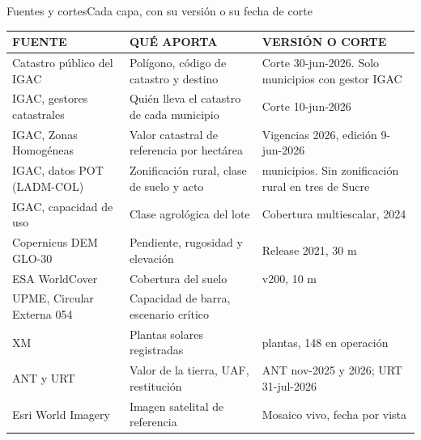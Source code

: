 \documentclass[aspectratio=169, 11pt]{beamer}
\renewcommand{\arraystretch}{1.25}
\begin{document}
\begin{frame}{Fuentes y cortes}{Cada capa, con su versión o su fecha de corte}
  {\scriptsize\renewcommand{\arraystretch}{0.82}
  \begin{tabular}{@{}>{\raggedright\arraybackslash}p{3.4cm} >{\raggedright\arraybackslash}p{4.5cm} >{\raggedright\arraybackslash}p{5.5cm}@{}}
    \toprule
    \textcolor{tinta3}{FUENTE} & \textcolor{tinta3}{QUÉ APORTA} & \textcolor{tinta3}{VERSIÓN O CORTE}\\
    \midrule
    Catastro público del IGAC & Polígono, código de catastro y destino & Corte 30-jun-2026. Solo municipios con gestor IGAC\\
    IGAC, gestores catastrales & Quién lleva el catastro de cada municipio & Corte 10-jun-2026\\
    IGAC, Zonas Homogéneas & Valor catastral de referencia por hectárea & Vigencias 2026, edición 9-jun-2026\\
    IGAC, datos POT (LADM-COL) & Zonificación rural, clase de suelo y acto & 761 municipios. Sin zonificación rural en tres de Sucre\\
    IGAC, capacidad de uso & Clase agrológica del lote & Cobertura multiescalar, 2024\\
    Copernicus DEM GLO-30 & Pendiente, rugosidad y elevación & Release 2021, 30 m\\
    ESA WorldCover & Cobertura del suelo & 2021 v200, 10 m\\
    UPME, Circular Externa 054 & Capacidad de barra, escenario crítico & 2026\\
    XM & Plantas solares registradas & 253 plantas, 148 en operación\\
    ANT y URT & Valor de la tierra, UAF, restitución & ANT nov-2025 y 2026; URT 31-jul-2026\\
    Esri World Imagery & Imagen satelital de referencia & Mosaico vivo, fecha por vista\\
    \bottomrule
  \end{tabular}}
\end{frame}
\end{document}
